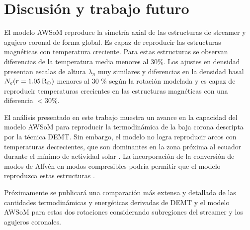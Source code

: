 \documentclass[baaa]{baaa}
\begin{document}

\section{Discusión y trabajo futuro}

El modelo AWSoM reproduce la simetría axial de las estructuras de streamer y agujero coronal de forma global. Es capaz de reproducir las estructuras magnéticas con temperatura creciente. Para estas estructuras se observan diferencias de la temperatura media menores al 30\%. Los ajustes en densidad presentan escalas de altura $\lambda_n$ muy similares y diferencias en la densidad basal $N_e(r=1.05\,{\rm R_\odot})$  menores al 30 \% según la rotación modelada y es capaz de reproducir temperaturas crecientes en las estructuras magnéticas con una diferencia $<30 \%$. 
 

El análisis presentado en este trabajo muestra un  avance en la capacidad del modelo AWSoM para reproducir la termodinámica de la baja corona descripta por la técnica DEMT. Sin embargo, el modelo no logra reproducir arcos con temperaturas decrecientes, que son dominantes en la zona próxima al ecuador durante el mínimo de actividad solar \citep{nuevo_2013}.  La incorporación de la conversión de modos de Alfvén en modos compresibles podría permitir que el modelo reproduzca estas estructuras \citep{schiff_2016}.

Próximamente se publicará una comparación más extensa y detallada de las cantidades termodinámicas y energéticas derivadas de DEMT y el modelo AWSoM para estas dos rotaciones considerando subregiones del streamer y los agujeros coronales.
\end{document}
